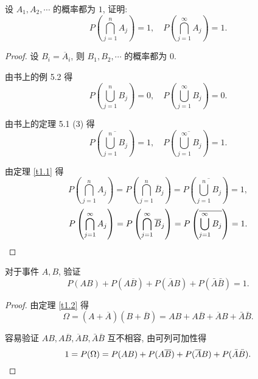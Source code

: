 \documentclass{ctexart}
\begin{document}
\begin{exercise}%
    设 $A_1,A_2,\cdots$ 的概率都为 $1$, 证明:
    \[P\left(\bigcap\limits_{j=1}^nA_j\right)=1,\quad P\left(\bigcap\limits_{j=1}^\infty A_j\right)=1.\]
\end{exercise}
\begin{proof}
    设 $B_i=\overline{A}_i$, 则 $B_1,B_2,\cdots$ 的概率都为 $0$.
    
    由书上的例 5.2 得
    \[P\left(\bigcup\limits_{j=1}^nB_j\right)=0,\quad P\left(\bigcup\limits_{j=1}^\infty B_j\right)=0.\]

    由书上的定理 5.1 (3) 得
    \[P\left(\overline{\bigcup\limits_{j=1}^nB_j}\right)=1,\quad P\left(\overline{\bigcup\limits_{j=1}^\infty B_j}\right)=1.\]

    由定理 \ref{t1.1} 得
    \[P\left(\bigcap\limits_{j=1}^nA_j\right)=P\left(\bigcap\limits_{j=1}^n\overline{B}_j\right)=P\left(\overline{\bigcup\limits_{j=1}^nB_j}\right)=1,\]
    \[P\left(\bigcap\limits_{j=1}^\infty A_j\right)=P\left(\bigcap\limits_{j=1}^\infty\overline{B}_j\right)=P\left(\overline{\bigcup\limits_{j=1}^\infty B_j}\right)=1.\qedhere\]
\end{proof}
\begin{exercise}\label{ex1.19}
    对于事件 $A,B$, 验证
    \[P(AB)+P(A\overline{B})+P(\overline{A}B)+P(\bar{A}\bar{B})=1.\]
\end{exercise}
\begin{proof}
    由定理 \ref{t1.2} 得
    \[\Omega=(A+\overline{A})(B+\overline{B})=AB+A\overline{B}+\overline{A}B+\bar{A}\bar{B}.\]

    容易验证 $AB,A\overline{B},\overline{A}B,\bar{A}\bar{B}$ 互不相容, 由可列可加性得
    \[1=P(\Omega)=P(AB)+P(A\overline{B})+P(\overline{A}B)+P(\bar{A}\bar{B}).\qedhere\]
\end{proof}
\end{document}
